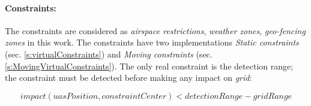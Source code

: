 \paragraph{Constraints:} The constraints are considered as \emph{airspace restrictions}, \emph{weather zones}, \emph{geo-fencing zones} in this work. The constraints have two implementations \emph{Static constraints} (sec. \ref{s:virtualConstraints}) and \emph{Moving constraints} (sec. \ref{s:MovingVirtualConstraints}). The only real constraint is the detection range; the constraint must be detected before making any impact on \emph{grid}:

\begin{equation*}
    impact(uasPosition,constraintCenter) < detection Range - grid Range
\end{equation*}




